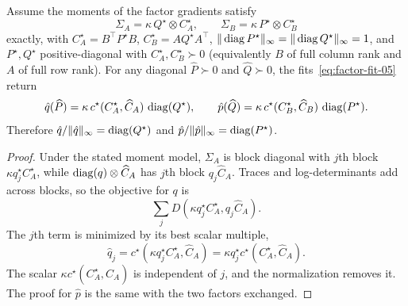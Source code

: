 \begin{lemma}\label{lem:consistency-05}
Assume the moments of the factor gradients satisfy
\[
  \Sigma_A=\kappa\,Q^\star\otimes C^\star_A,
  \qquad
  \Sigma_B=\kappa\,P^\star\otimes C^\star_B
\]
exactly, with
$C^\star_A=B^\top P^\star B$,
$C^\star_B=AQ^\star A^\top$,
$\| \operatorname{diag} P^\star\|_\infty=\| \operatorname{diag} Q^\star\|_\infty=1$, and
$P^\star,Q^\star$ positive-diagonal with $C^\star_A,C^\star_B\succ0$ (equivalently
$B$ of full column rank and $A$ of full row rank).
For any diagonal $\widehat P\succ0$ and $\widehat Q\succ0$, the
fits~\eqref{eq:factor-fit-05} return
\[
  \hat{q}(\widehat P)
  =
  \kappa\,c^\star(C^\star_A,\widehat C_A)\,\operatorname{diag}(Q^\star),
  \qquad
  \hat{p}(\widehat Q)
  =
  \kappa\,c^\star(C^\star_B,\widehat C_B)\,\operatorname{diag}(P^\star).
\]
Therefore
$\hat{q}/\| \hat{q}\|_\infty=\operatorname{diag}(Q^\star)$ and
$\hat{p}/\| \hat{p}\|_\infty=\operatorname{diag}(P^\star)$.
\end{lemma}
\begin{proof}
Under the stated moment model, $\Sigma_A$ is block diagonal
with $j$th block $\kappa q^\star_j C^\star_A$, while
$\operatorname{diag}(q)\otimes\widehat C_A$ has $j$th block $q_j\widehat C_A$.
Traces and log-determinants add across blocks, so the objective for
$q$ is
\[
  \sum_j D(\kappa q^\star_j C^\star_A, q_j\widehat C_A).
\]
The $j$th term is minimized by its best scalar multiple,
\[
  \hat q_j
  =
  c^\star(\kappa q^\star_j C^\star_A,\widehat C_A)
  =
  \kappa q^\star_j c^\star(C^\star_A,\widehat C_A).
\]
The scalar $\kappa c^\star(C^\star_A,\widehat C_A)$ is independent of
$j$, and the normalization removes it. The proof for $\hat p$ is the
same with the two factors exchanged.
\end{proof}

